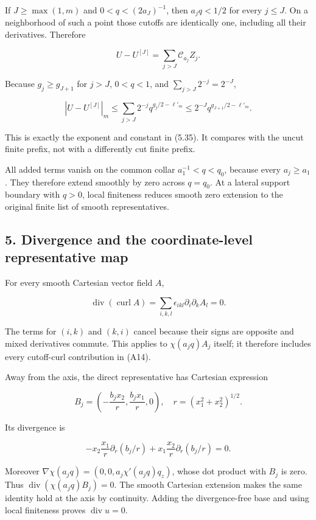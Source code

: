 \documentclass[10pt,a4paper]{article}
\begin{document}
If \(J\ge\max(1,m)\) and \(0<q<(2a_J)^{-1}\), then \(a_jq<1/2\) for every \(j\le J\). On a neighborhood of such a point those cutoffs are identically one, including all their derivatives. Therefore

\[
U-U^{[J]}=\sum_{j>J}\mathcal C_{a_j}Z_j.
\]

Because \(g_j\ge g_{J+1}\) for \(j>J\), \(0<q<1\), and \(\sum_{j>J}2^{-j}=2^{-J}\),

\[
|U-U^{[J]}|_m
\le\sum_{j>J}2^{-j}q^{g_j/2-\ell'_m}
\le2^{-J}q^{g_{J+1}/2-\ell'_m}.
\tag{A22}
\]

This is exactly the exponent and constant in (5.35). It compares with the uncut finite prefix, not with a differently cut finite prefix.

All added terms vanish on the common collar \(a_1^{-1}<q<q_0\), because every \(a_j\ge a_1\). They therefore extend smoothly by zero across \(q=q_0\). At a lateral support boundary with \(q>0\), local finiteness reduces smooth zero extension to the original finite list of smooth representatives.

\subsection{5. Divergence and the coordinate-level representative map}\label{divergence-and-the-coordinate-level-representative-map}

For every smooth Cartesian vector field \(A\),

\[
\operatorname{div}(\operatorname{curl}A)
=\sum_{i,k,l}\epsilon_{ikl}\partial_i\partial_k A_l=0.
\tag{A23}
\]

The terms for \((i,k)\) and \((k,i)\) cancel because their signs are opposite and mixed derivatives commute. This applies to \(\chi(a_jq)A_j\) itself; it therefore includes every cutoff-curl contribution in (A14).

Away from the axis, the direct representative has Cartesian expression

\[
B_j=\left(-\frac{b_jx_2}{r},\frac{b_jx_1}{r},0\right),\quad
r=(x_1^2+x_2^2)^{1/2}.
\]

Its divergence is

\[
-x_2\frac{x_1}{r}\partial_r(b_j/r)
+x_1\frac{x_2}{r}\partial_r(b_j/r)=0.
\tag{A24}
\]

Moreover \(\nabla\chi(a_jq)=(0,0,a_j\chi'(a_jq)q_z)\), whose dot product with \(B_j\) is zero. Thus \(\operatorname{div}(\chi(a_jq)B_j)=0\). The smooth Cartesian extension makes the same identity hold at the axis by continuity. Adding the divergence-free base and using local finiteness proves \(\operatorname{div}u=0\).
\end{document}

